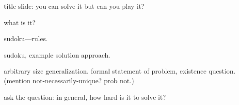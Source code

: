 \documentclass{presentation}
\begin{document}
  
\begin{frame}
  title slide: you can solve it but can you play it?
\end{frame}

\begin{frame}
  what is it?

  sudoku---rules.
\end{frame}

\begin{frame}
  sudoku, example solution approach.  
\end{frame}

\begin{frame}
  arbitrary size generalization.  formal statement of problem, existence
  question.  (mention not-necessarily-unique? prob not.)
\end{frame}

%
%
%
%
%
%
%
%
%

\begin{frame}
  ask the question: in general, how hard is it to solve it?
\end{frame}
\end{document}
